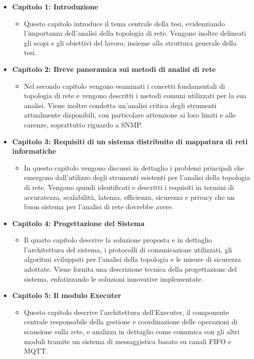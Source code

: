 \documentclass[target=bach,aauheader=,style=]{thud}
\begin{document}
\begin{itemize}
  \item \textbf{Capitolo 1: Introduzione}
  \begin{itemize}
    \item[] Questo capitolo introduce il tema centrale della tesi, evidenziando l'importanza dell'analisi della topologia di rete. Vengono inoltre delineati gli scopi e gli obiettivi del lavoro, insieme alla struttura generale della tesi.
  \end{itemize}


\item \textbf{Capitolo 2: Breve panoramica sui metodi di analisi di rete}
    \begin{itemize}
      \item[] Nel secondo capitolo vengono esaminati i concetti fondamentali di topologia di rete e vengono descritti i metodi comuni utilizzati per la sua analisi. Viene inoltre condotta un'analisi critica degli strumenti attualmente disponibili, con particolare attenzione ai loro limiti e alle carenze, soprattutto riguardo a SNMP.
    \end{itemize}


  \item \textbf{Capitolo 3: Requisiti di un sistema distribuito di mappatura di reti informatiche}
    \begin{itemize}
      \item[] In questo capitolo vengono discussi in dettaglio i problemi principali che emergono dall'utilizzo degli strumenti esistenti per l'analisi della topologia di rete. Vengono quindi identificati e descritti i requisiti in termini di accuratezza, scalabilità, latenza, efficienza, sicurezza e privacy che un buon sistema per l'analisi di rete dovrebbe avere.
    \end{itemize}


  \item \textbf{Capitolo 4: Progettazione del Sistema}
    \begin{itemize}
      \item[] Il quarto capitolo descrive la soluzione proposta e in dettaglio l'architettura del sistema, i protocolli di comunicazione utilizzati, gli algoritmi sviluppati per l'analisi della topologia e le misure di sicurezza adottate. Viene fornita una descrizione tecnica della progettazione del sistema, enfatizzando le soluzioni innovative implementate.
    \end{itemize}


  \item \textbf{Capitolo 5: Il modulo Executer}
    \begin{itemize}
      \item[] Questo capitolo descrive l'architettura dell'Executer, il componente centrale responsabile della gestione e coordinazione delle operazioni di scansione sulla rete, e analizza in dettaglio come comunica con gli altri moduli tramite un sistema di messaggistica basato su canali FIFO e MQTT.
    \end{itemize}



\end{itemize}
\end{document}
